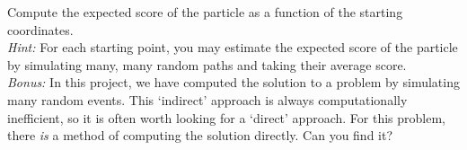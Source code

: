 Compute the expected score of the particle as a function of the starting coordinates.\\

\textit{Hint:} For each starting point, you may estimate the expected score of the particle by simulating many, many random paths and taking their average score.\\

\noindent\textit{Bonus:} In this project, we have computed the solution to a problem by simulating many random events. This `indirect' approach is always computationally inefficient, so it is often worth looking for a `direct' approach. For this problem, there \textit{is} a method of computing the solution directly. Can you find it?

